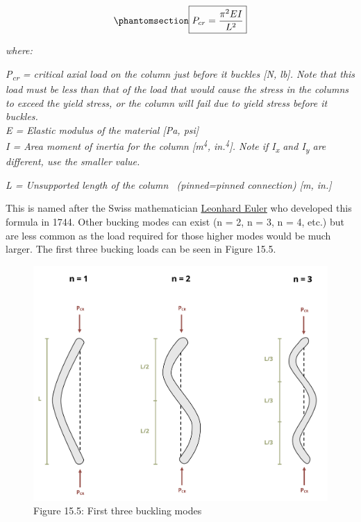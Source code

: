 \documentclass[
  letterpaper,
  DIV=11,
  numbers=noendperiod]{scrreprt}
\theoremstyle{definition}
\theoremstyle{remark}
\begin{document}
\begin{equation}\phantomsection\label{eq-15.1}{
\boxed{P_{c r}=\frac{\pi^2 E I}{L^2}}
}\end{equation}

\emph{where:}

\emph{P\textsubscript{cr} = critical axial load on the column just
before it buckles {[}N, lb{]}. Note that this load must be less than
that of the load that would cause the stress in the columns to exceed
the yield stress, or the column will fail due to yield stress before it
buckles.}\\
\emph{E = Elastic modulus of the material {[}Pa, psi{]}}\\
\emph{I = Area moment of inertia for the column {[}m\textsuperscript{4},
in.\textsuperscript{4}{]}. Note if I\textsubscript{x} and
I\textsubscript{y} are different, use the smaller value.}

\emph{L = Unsupported length of the column~ (pinned=pinned connection)
{[}m, in.{]}}

This is named after the Swiss mathematician
\href{https://en.wikipedia.org/wiki/Leonhard_Euler}{Leonhard Euler} who
developed this formula in 1744. Other bucking modes can exist (n = 2, n
= 3, n = 4, etc.) but are less common as the load required for those
higher modes would be much larger. The first three bucking loads can be
seen in Figure 15.5.

\begin{figure}[H]

{\centering \includegraphics{images/CH15s PNGs/figure 15.5.png}

}

\caption{Figure 15.5: First three buckling modes}

\end{figure}%
\end{document}

